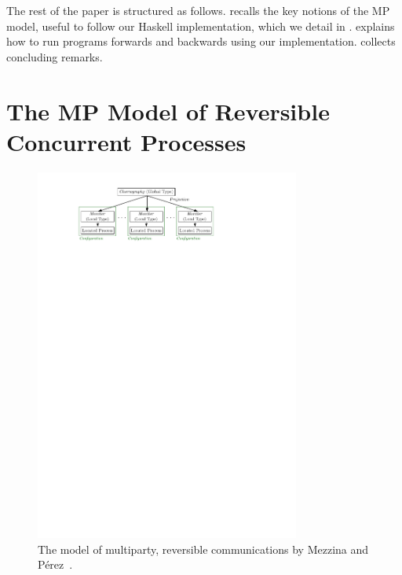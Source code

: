 \documentclass[runningheads,plain]{llncs}
\begin{document}
The rest of the paper is structured as follows.
  recalls the key notions of the MP model, useful to follow our Haskell implementation, which we detail 
in  .
  explains how to run programs forwards and backwards using our implementation.
  collects concluding remarks. 


\section{The MP Model of Reversible Concurrent Processes}
\label{the-process-model}

\begin{figure}[!t]
\begin{center}
    \includegraphics[width=8.7cm]{./img/figmodel.pdf}
\end{center}
\caption{The model of multiparty, reversible communications by   Mezzina and P\'erez~\cite{DBLP:conf/ppdp/MezzinaP17}.}\label{f:model}
\end{figure}
\end{document}
